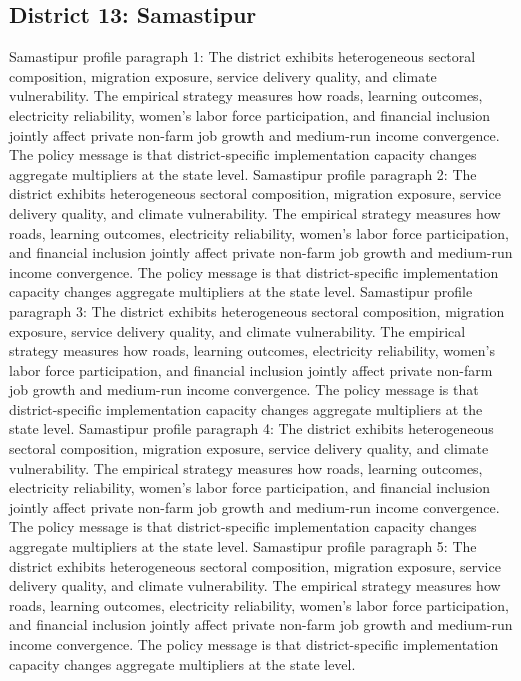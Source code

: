 \documentclass[preprint,12pt]{elsarticle}
\begin{document}
\subsection{District 13: Samastipur}
Samastipur profile paragraph 1: The district exhibits heterogeneous sectoral composition, migration exposure, service delivery quality, and climate vulnerability. The empirical strategy measures how roads, learning outcomes, electricity reliability, women's labor force participation, and financial inclusion jointly affect private non-farm job growth and medium-run income convergence. The policy message is that district-specific implementation capacity changes aggregate multipliers at the state level.
Samastipur profile paragraph 2: The district exhibits heterogeneous sectoral composition, migration exposure, service delivery quality, and climate vulnerability. The empirical strategy measures how roads, learning outcomes, electricity reliability, women's labor force participation, and financial inclusion jointly affect private non-farm job growth and medium-run income convergence. The policy message is that district-specific implementation capacity changes aggregate multipliers at the state level.
Samastipur profile paragraph 3: The district exhibits heterogeneous sectoral composition, migration exposure, service delivery quality, and climate vulnerability. The empirical strategy measures how roads, learning outcomes, electricity reliability, women's labor force participation, and financial inclusion jointly affect private non-farm job growth and medium-run income convergence. The policy message is that district-specific implementation capacity changes aggregate multipliers at the state level.
Samastipur profile paragraph 4: The district exhibits heterogeneous sectoral composition, migration exposure, service delivery quality, and climate vulnerability. The empirical strategy measures how roads, learning outcomes, electricity reliability, women's labor force participation, and financial inclusion jointly affect private non-farm job growth and medium-run income convergence. The policy message is that district-specific implementation capacity changes aggregate multipliers at the state level.
Samastipur profile paragraph 5: The district exhibits heterogeneous sectoral composition, migration exposure, service delivery quality, and climate vulnerability. The empirical strategy measures how roads, learning outcomes, electricity reliability, women's labor force participation, and financial inclusion jointly affect private non-farm job growth and medium-run income convergence. The policy message is that district-specific implementation capacity changes aggregate multipliers at the state level.
\end{document}

